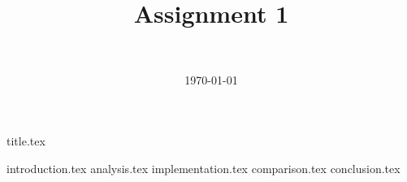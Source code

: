 \documentclass[final]{article}
\title{Assignment 1}
\author{~}
\date{\today}
\begin{document}

{title.tex}
\newpage
\tableofcontents

\newpage
{}
{introduction.tex}
\newpage
{analysis.tex}
{implementation.tex}
{comparison.tex}
{conclusion.tex}

\printbibliography
\end{document}
